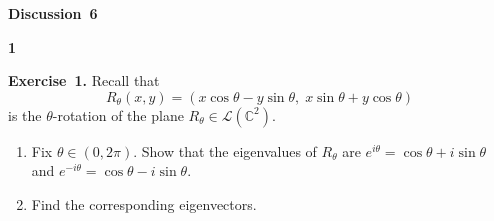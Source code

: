 \documentclass[11pt]{article}
\newcommand{\AssignmentType}{Discussion} %
\newcommand{\AssignmentNumber}{6}
\newcommand{\ProblemDivider}[1]{%
  \vspace{1.0em}
  \noindent\textbf{#1}\par
  \vspace{0.35em}
}
\newcommand{\ProblemAnnounce}{\noindent}
\newcommand{\Exercise}[1]{\textbf{Exercise~#1.}\;}
\newcommand{\C}{\mathbb{C}}
\begin{document}
\begin{center}
  {\Large \textbf{\AssignmentType~\AssignmentNumber}}
\end{center}
\vspace{0.75em}

\ProblemDivider{1}

\begin{problemBox}
\ProblemAnnounce
\Exercise{1}
Recall that
\[
R_{\theta}(x,y) = (x\cos\theta - y\sin\theta,\; x\sin\theta + y\cos\theta)
\]
is the \(\theta\)-rotation of the plane \(R_{\theta} \in \mathcal{L}(\C^2)\).

\begin{enumerate}
    \item[(a)] Fix \(\theta \in (0,2\pi)\). Show that the eigenvalues of \(R_{\theta}\) are \(e^{i\theta} = \cos\theta + i\sin\theta\) and \(e^{-i\theta} = \cos\theta - i\sin\theta\).
    \item[(b)] Find the corresponding eigenvectors.
\end{enumerate}
\end{problemBox}
\end{document}

